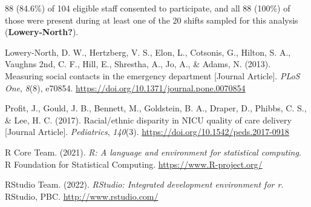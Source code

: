 \documentclass[
]{article}
\newlength{\cslhangindent}
\newlength{\cslentryspacingunit} %
\newenvironment{CSLReferences}[2] %
 {%
  \setlength{\parindent}{0pt}
  \ifodd #1
  \let\oldpar\par
  \def\par{\hangindent=\cslhangindent\oldpar}
  \fi
  \setlength{\parskip}{#2\cslentryspacingunit}
 }%
 {}
\begin{document}
88 (84.6\%) of 104 eligible staff consented to participate, and all 88
(100\%) of those were present during at least one of the 20 shifts
sampled for this analysis (\textbf{Lowery-North?}).

\hypertarget{refs}{}
\begin{CSLReferences}{1}{0}
\leavevmode{}%
Lowery-North, D. W., Hertzberg, V. S., Elon, L., Cotsonis, G., Hilton,
S. A., Vaughns 2nd, C. F., Hill, E., Shrestha, A., Jo, A., \& Adams, N.
(2013). Measuring social contacts in the emergency department {[}Journal
Article{]}. \emph{PLoS One}, \emph{8}(8), e70854.
\url{https://doi.org/10.1371/journal.pone.0070854}

\leavevmode{}%
Profit, J., Gould, J. B., Bennett, M., Goldstein, B. A., Draper, D.,
Phibbs, C. S., \& Lee, H. C. (2017). Racial/ethnic disparity in NICU
quality of care delivery {[}Journal Article{]}. \emph{Pediatrics},
\emph{140}(3). \url{https://doi.org/10.1542/peds.2017-0918}

\leavevmode{}%
R Core Team. (2021). \emph{R: A language and environment for statistical
computing}. R Foundation for Statistical Computing.
\url{https://www.R-project.org/}

\leavevmode{}%
RStudio Team. (2022). \emph{RStudio: Integrated development environment
for r}. RStudio, PBC. \url{http://www.rstudio.com/}

\end{CSLReferences}
\end{document}
